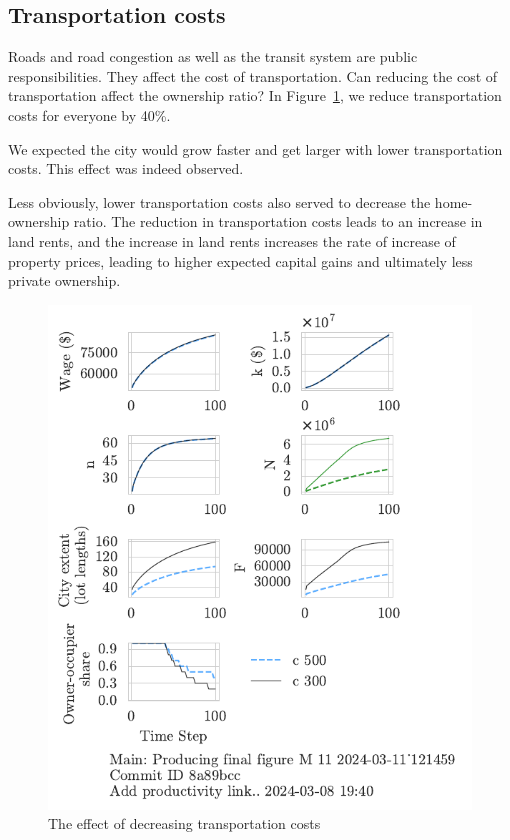\newpage
\subsection{Transportation costs}
Roads and road congestion as well as the transit system are public responsibilities. They affect the cost of transportation. Can reducing the cost of transportation affect the ownership ratio? In Figure~\ref{fig:c_ownership_trajectory}, we reduce transportation costs for everyone by 40\%. 

We expected the city would grow faster and get larger with lower transportation costs. This effect was indeed observed. 

Less obviously, lower transportation costs also served to decrease the home-ownership ratio. The reduction in transportation costs leads to an increase in land rents, and the increase in land rents increases the rate of increase of property prices, leading to higher expected capital gains and ultimately less private ownership. 

\begin{figure}[h!t]
    \centering
    \includegraphics[scale=1, trim={0 1.4cm 0 0},clip]{fig/c-Main-121459.pdf}
    \caption{The effect of decreasing transportation costs}
    \label{fig:c_ownership_trajectory}
\end{figure}

